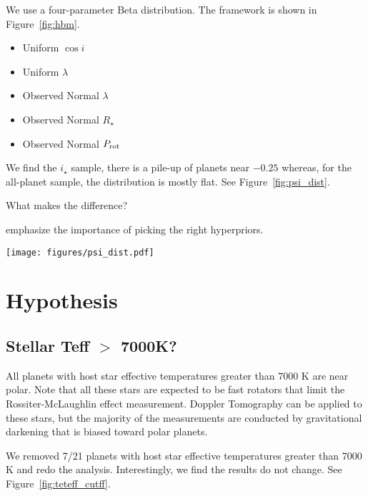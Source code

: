 \documentclass[twocolumn]{aastex631}
\begin{document}
We use a four-parameter Beta distribution. The framework is shown in Figure~\ref{fig:hbm}.

\begin{itemize}
    \item Uniform $\cos{i}$
    \item Uniform $\lambda$
    \item Observed Normal $\lambda$
    \item Observed Normal $R_\star$
    \item Observed Normal $P_{\rm rot}$
\end{itemize}

We find the $i_\star$ sample, there is a pile-up of planets near $-0.25$ whereas, for the all-planet sample, the distribution is mostly flat. See Figure~\ref{fig:psi_dist}.

What makes the difference?

\cite{Nagpal22} emphasize the importance of picking the right hyperpriors.

\begin{figure*}[ht!]
    \begin{centering}
        \texttt{[image: figures/psi\_dist.pdf]}
        \caption{$\cos{\psi}$ distributions.}
        \label{fig:psi_dist}
    \end{centering}
\end{figure*}

\section{Hypothesis} \label{sec:tests}

\subsection{Stellar Teff $>$ 7000K?}
All planets with host star effective temperatures greater than 7000 K are near polar.
Note that all these stars are expected to be fast rotators that limit the Rossiter-McLaughlin effect measurement. Doppler Tomography can be applied to these stars, but the majority of the measurements are conducted by gravitational darkening that is biased toward polar planets.

We removed 7/21 planets with host star effective temperatures greater than 7000 K and redo the analysis. Interestingly, we find the results do not change. See Figure~\ref{fig:teteff_cutff}.

\end{document}
